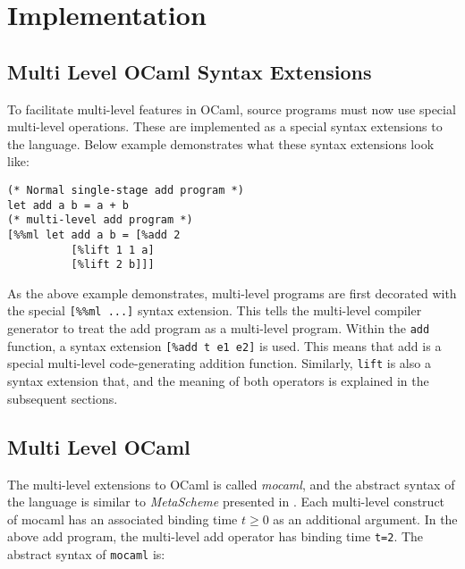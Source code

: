 
\section{Implementation}

\subsection{Multi Level OCaml Syntax Extensions}

To facilitate multi-level features in OCaml, source programs must now use special multi-level operations. These are implemented as a special syntax extensions to the language. Below example demonstrates what these syntax extensions look like:

\begin{verbatim}
(* Normal single-stage add program *)
let add a b = a + b
(* multi-level add program *)
[%%ml let add a b = [%add 2
          [%lift 1 1 a]
          [%lift 2 b]]]
\end{verbatim}

As the above example demonstrates, multi-level programs are first decorated with the special \texttt{[\%\%ml ...]} syntax extension. This tells the multi-level compiler generator to treat the add program as a multi-level program. Within the \texttt{add} function, a syntax extension \texttt{[\%add t e1 e2]} is used. This means that add is a special multi-level code-generating addition function. Similarly, \texttt{lift} is also a syntax extension that, and the meaning of both operators is explained in the subsequent sections.

\subsection{Multi Level OCaml}

The multi-level extensions to OCaml is called \textit{mocaml}, and the abstract syntax of the language is similar to \textit{MetaScheme} presented in \cite{multilevel}.
Each multi-level construct of mocaml has an associated binding time $t \ge 0$ as an additional argument. In the above add program, the multi-level add operator has binding time \texttt{t=2}. The abstract syntax of \texttt{mocaml} is:

